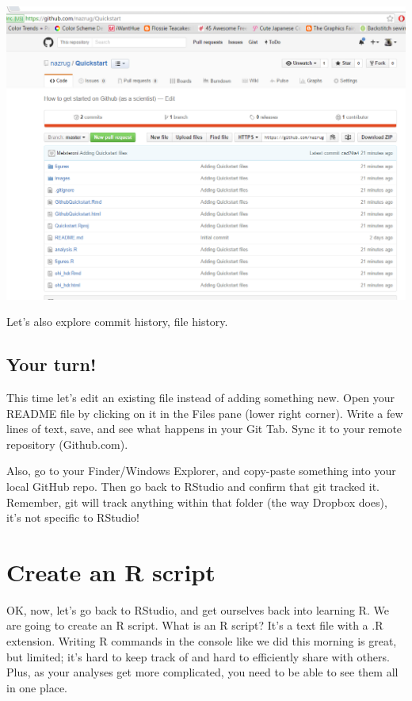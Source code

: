 \documentclass[]{book}
\theoremstyle{definition}
\theoremstyle{definition}
\theoremstyle{definition}
\theoremstyle{remark}
\begin{document}
\includegraphics{img/Github_remote.png}

Let's also explore commit history, file history.

\subsection{Your turn!}\label{your-turn-2}

This time let's edit an existing file instead of adding something new.
Open your README file by clicking on it in the Files pane (lower right
corner). Write a few lines of text, save, and see what happens in your
Git Tab. Sync it to your remote repository (Github.com).

Also, go to your Finder/Windows Explorer, and copy-paste something into
your local GitHub repo. Then go back to RStudio and confirm that git
tracked it. Remember, git will track anything within that folder (the
way Dropbox does), it's not specific to RStudio!

\section{Create an R script}\label{create-an-r-script}

OK, now, let's go back to RStudio, and get ourselves back into learning
R. We are going to create an R script. What is an R script? It's a text
file with a .R extension. Writing R commands in the console like we did
this morning is great, but limited; it's hard to keep track of and hard
to efficiently share with others. Plus, as your analyses get more
complicated, you need to be able to see them all in one place.
\end{document}

